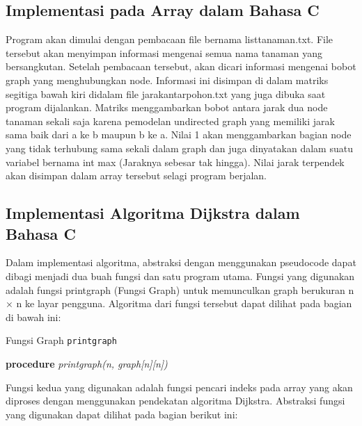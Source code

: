 \documentclass[conference]{IEEEtran}
\begin{document}
\subsection{Implementasi pada Array dalam Bahasa C}
Program akan dimulai dengan pembacaan file bernama
listtanaman.txt. File tersebut akan menyimpan informasi mengenai semua nama tanaman yang bersangkutan. Setelah pembacaan tersebut, akan dicari informasi mengenai bobot graph
yang menghubungkan node. Informasi ini disimpan di dalam
matriks segitiga bawah kiri didalam file jarakantarpohon.txt
yang juga dibuka saat program dijalankan. Matriks menggambarkan bobot antara jarak dua node tanaman sekali saja karena
pemodelan undirected graph yang memiliki jarak sama baik
dari a ke b maupun b ke a. Nilai 1 akan menggambarkan
bagian node yang tidak terhubung sama sekali dalam graph
dan juga dinyatakan dalam suatu variabel bernama int max
(Jaraknya sebesar tak hingga). Nilai jarak terpendek akan
disimpan dalam array tersebut selagi program berjalan.

\subsection{Implementasi Algoritma Dijkstra dalam Bahasa C}
Dalam implementasi algoritma, abstraksi dengan menggunakan pseudocode dapat dibagi menjadi dua buah fungsi dan
satu program utama. Fungsi yang digunakan adalah fungsi
printgraph (Fungsi Graph) untuk memunculkan graph berukuran n × n ke layar pengguna. Algoritma dari fungsi tersebut
dapat dilihat pada bagian di bawah ini:

\begin{algorithm}
    \caption{Fungsi Graph \texttt{printgraph} }\label{alg:two}
    \DontPrintSemicolon
    \textbf{procedure} \emph{printgraph(n, graph[n][n])}\;
\end{algorithm}

Fungsi kedua yang digunakan adalah fungsi pencari indeks
pada array yang akan diproses dengan menggunakan pendekatan algoritma Dijkstra. Abstraksi fungsi yang digunakan
dapat dilihat pada bagian berikut ini:
\end{document}
